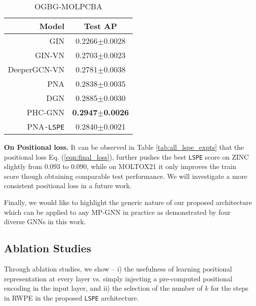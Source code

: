 \documentclass{article} \usepackage{iclr2021_conference,times}
\begin{document}
\begin{table}[!t]
{\begin{subtable}{.43\linewidth}
        \label{tab:comparison_moltox21}
    \end{subtable}
    \begin{subtable}{.43\linewidth}
      \centering
      \caption{OGBG-MOLPCBA}
        \begin{tabular}{rc}
        \toprule
        \textbf{Model} & \textbf{Test AP}\\
        \midrule
        GIN & 0.2266$\pm$0.0028\\
        GIN-VN & 0.2703$\pm$0.0023\\
        DeeperGCN-VN & 0.2781$\pm$0.0038\\
        PNA & 0.2838$\pm$0.0035\\
        DGN & 0.2885$\pm$0.0030\\
        PHC-GNN & \textbf{0.2947$\pm$0.0026}\\
        \midrule
        PNA\texttt{-LSPE} & 0.2840$\pm$0.0021\\
        \bottomrule
        \end{tabular}
        \label{tab:comparison_molpcba}
    \end{subtable}
    }
    \label{tab:comparison_sota}
    \vspace{-16pt}
\end{table}






{\bf On Positional loss.}
It can be observed in Table \ref{tab:all_lspe_expts} that the positional loss 
Eq. (\ref{eqn:final_loss}),
further pushes the best \texttt{LSPE} score on ZINC slightly from $0.093$ to $0.090$, while on MOLTOX21 it only improves the train score though obtaining comparable test performance.
We will investigate a more consistent positional loss in a future work.





Finally, we would like to highlight the generic nature of our proposed architecture which can be applied to any MP-GNN in practice as demonstrated by four diverse GNNs in this work.



\subsection{Ablation Studies}
\label{sec:experiments_ablation_studies}
Through ablation studies, we show -- i) the usefulness of learning positional representation at every layer vs. simply injecting a pre-computed positional encoding in the input layer,
and ii) the selection of the number of $k$ for the steps in RWPE in the proposed \texttt{LSPE} architecture.
\end{document}
